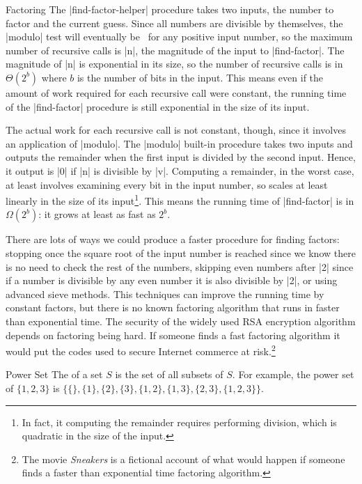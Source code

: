 \begin{schemeregion}
\begin{examplenobar}{Factoring}
The \scheme|find-factor-helper| procedure takes two inputs, the number to factor and the current guess.  Since all numbers are divisible by themselves, the \scheme|modulo| test will eventually be \true\ for any positive input number, so the maximum number of recursive calls is \scheme|n|, the magnitude of the input to \scheme|find-factor|.  The magnitude of \scheme|n| is exponential in its size, so the number of recursive calls is in $\Theta(2^b)$ where $b$ is the number of bits in the input.  This means even if the amount of work required for each recursive call were constant, the running time of the \scheme|find-factor| procedure is still exponential in the size of its input.  

The actual work for each recursive call is not constant, though, since it involves an application of \scheme|modulo|.  The \scheme|modulo| built-in procedure takes two inputs and outputs the remainder when the first input is divided by the second input.  Hence, it output is \scheme|0| if \scheme|n| is divisible by \scheme|v|.  Computing a remainder, in the worst case, at least involves examining every bit in the input number, so scales at least linearly in the size of its input\footnote{In fact, it computing the remainder requires performing division, which is quadratic in the size of the input.}.  This means the running time of \scheme|find-factor| is in $\Omega(2^b)$: it grows at least as fast as $2^b$.

There are lots of ways we could produce a faster procedure for finding factors: stopping once the square root of the input number is reached since we know there is no need to check the rest of the numbers, skipping even numbers after \scheme|2| since if a number is divisible by any even number it is also divisible by \scheme|2|, or using advanced sieve methods.  This techniques can improve the running time by constant factors, but there is no known factoring algorithm that runs in faster than exponential time.  The security of the widely used RSA encryption algorithm depends on factoring being hard.  If someone finds a fast factoring algorithm it would put the codes used to secure Internet commerce at risk.\footnote{The movie \emph{Sneakers} is a fictional account of what would happen if someone finds a faster than exponential time factoring algorithm.}
\end{examplenobar}

\begin{example}{Power Set}  The  of a set $S$ is the set of all subsets of $S$.  For example, the power set of $\{1, 2, 3\}$ is 
$\{\{\}, \{1\}, \{2\}, \{3\}, \{1, 2\}, \{1, 3\}, \{2, 3\}, \{1, 2, 3\}\}$.


\end{example}
\end{schemeregion}

